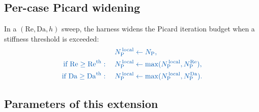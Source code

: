 \documentclass{article}
\newcommand{\extline}[1]{{\color{extcolor}#1}}
\begin{document}
\subsection{Per-case Picard widening}
\label{sec:harness-picard}

\extline{In a $(\mathrm{Re}, \mathrm{Da}, h)$ sweep, the harness widens
the Picard iteration budget when a stiffness threshold is exceeded:}
\begin{equation}
    \textcolor{extcolor}{\begin{aligned}
    N_{\mathrm{P}}^{\,\mathrm{local}} &\gets N_{\mathrm{P}}, \\
    \text{if } \mathrm{Re} \ge \mathrm{Re}^{\mathrm{th}}: \quad
    N_{\mathrm{P}}^{\,\mathrm{local}} &\gets \max(N_{\mathrm{P}}^{\,\mathrm{local}}, N_{\mathrm{P}}^{\mathrm{Re}}), \\
    \text{if } \mathrm{Da} \ge \mathrm{Da}^{\mathrm{th}}: \quad
    N_{\mathrm{P}}^{\,\mathrm{local}} &\gets \max(N_{\mathrm{P}}^{\,\mathrm{local}}, N_{\mathrm{P}}^{\mathrm{Da}}).
    \end{aligned}}
\end{equation}

\subsection{Parameters of this extension}
\end{document}
